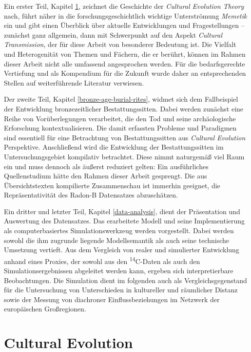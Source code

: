 \documentclass[openany,twoside,twocolumn]{book}
\begin{document}
Ein erster Teil, Kapitel \ref{cultural-evolution}, zeichnet die
Geschichte der \emph{Cultural Evolution Theory} nach, führt näher in die
forschungsgeschichtlich wichtige Unterströmung \emph{Memetik} ein und
gibt einen Überblick über aktuelle Entwicklungen und Fragestellungen --
zunächst ganz allgemein, dann mit Schwerpunkt auf den Aspekt
\emph{Cultural Transmission}, der für diese Arbeit von besonderer
Bedeutung ist. Die Vielfalt und Heterogenität von Themen und Fächern,
die er berührt, können im Rahmen dieser Arbeit nicht alle umfassend
angesprochen werden. Für die bedarfsgerechte Vertiefung und als
Kompendium für die Zukunft wurde daher an entsprechenden Stellen auf
weiterführende Literatur verwiesen.

Der zweite Teil, Kapitel \ref{bronze-age-burial-rites}, widmet sich dem
Fallbeispiel der Entwicklung bronzezeitlicher Bestattungssitten. Dabei
werden zunächst eine Reihe von Vorüberlegungen verarbeitet, die den Tod
und seine archäologische Erforschung kontextualisieren. Die damit
erfassten Probleme und Paradigmen sind essentiell für eine Betrachtung
von Bestattungssitten aus \emph{Cultural Evolution} Perspektive.
Anschließend wird die Entwicklung der Bestattungssitten im
Untersuchungsgebiet kompilativ betrachtet. Diese nimmt naturgemäß viel
Raum ein und muss dennoch als äußerst reduziert gelten: Ein
ausführliches Quellenstudium hätte den Rahmen dieser Arbeit gesprengt.
Die aus Übersichtstexten kompilierte Zusammenschau ist immerhin
geeignet, die Repräsentativität des Radon-B Datensatzes abzuschätzen.

Ein dritter und letzter Teil, Kapitel \ref{data-analysis}, dient der
Präsentation und Auswertung des Datensatzes. Das erarbeitete Modell und
seine Implementierung als computerbasiertes Simulationswerkzeug werden
vorgestellt. Dabei werden sowohl die ihm zugrunde liegende
Modellsemantik als auch seine technische Umsetzung vertieft. Aus dem
Vergleich von realer und simulierter Entwicklung anhand eines Proxies,
der sowohl aus den \textsuperscript{14}C-Daten als auch den
Simulationsergebnissen abgeleitet werden kann, ergeben sich
interpretierbare Beobachtungen. Die Simulation dient im folgenden auch
als Vergleichsgegenstand für die Untersuchung von Unterschieden in
kultureller und räumlicher Distanz sowie der Messung von diachroner
Einflussbeziehungen im Netzwerk der europäischen Großregionen.

\hypertarget{cultural-evolution}{%
\chapter{Cultural Evolution}\label{cultural-evolution}}
\end{document}
